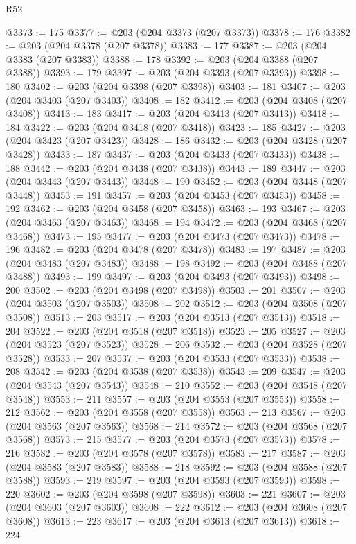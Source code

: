 \begin{lexlean}{R52}
\begin{coremodule}
@3373 := 175
@3377 := @203 (@204 @3373 (@207 @3373))
@3378 := 176
@3382 := @203 (@204 @3378 (@207 @3378))
@3383 := 177
@3387 := @203 (@204 @3383 (@207 @3383))
@3388 := 178
@3392 := @203 (@204 @3388 (@207 @3388))
@3393 := 179
@3397 := @203 (@204 @3393 (@207 @3393))
@3398 := 180
@3402 := @203 (@204 @3398 (@207 @3398))
@3403 := 181
@3407 := @203 (@204 @3403 (@207 @3403))
@3408 := 182
@3412 := @203 (@204 @3408 (@207 @3408))
@3413 := 183
@3417 := @203 (@204 @3413 (@207 @3413))
@3418 := 184
@3422 := @203 (@204 @3418 (@207 @3418))
@3423 := 185
@3427 := @203 (@204 @3423 (@207 @3423))
@3428 := 186
@3432 := @203 (@204 @3428 (@207 @3428))
@3433 := 187
@3437 := @203 (@204 @3433 (@207 @3433))
@3438 := 188
@3442 := @203 (@204 @3438 (@207 @3438))
@3443 := 189
@3447 := @203 (@204 @3443 (@207 @3443))
@3448 := 190
@3452 := @203 (@204 @3448 (@207 @3448))
@3453 := 191
@3457 := @203 (@204 @3453 (@207 @3453))
@3458 := 192
@3462 := @203 (@204 @3458 (@207 @3458))
@3463 := 193
@3467 := @203 (@204 @3463 (@207 @3463))
@3468 := 194
@3472 := @203 (@204 @3468 (@207 @3468))
@3473 := 195
@3477 := @203 (@204 @3473 (@207 @3473))
@3478 := 196
@3482 := @203 (@204 @3478 (@207 @3478))
@3483 := 197
@3487 := @203 (@204 @3483 (@207 @3483))
@3488 := 198
@3492 := @203 (@204 @3488 (@207 @3488))
@3493 := 199
@3497 := @203 (@204 @3493 (@207 @3493))
@3498 := 200
@3502 := @203 (@204 @3498 (@207 @3498))
@3503 := 201
@3507 := @203 (@204 @3503 (@207 @3503))
@3508 := 202
@3512 := @203 (@204 @3508 (@207 @3508))
@3513 := 203
@3517 := @203 (@204 @3513 (@207 @3513))
@3518 := 204
@3522 := @203 (@204 @3518 (@207 @3518))
@3523 := 205
@3527 := @203 (@204 @3523 (@207 @3523))
@3528 := 206
@3532 := @203 (@204 @3528 (@207 @3528))
@3533 := 207
@3537 := @203 (@204 @3533 (@207 @3533))
@3538 := 208
@3542 := @203 (@204 @3538 (@207 @3538))
@3543 := 209
@3547 := @203 (@204 @3543 (@207 @3543))
@3548 := 210
@3552 := @203 (@204 @3548 (@207 @3548))
@3553 := 211
@3557 := @203 (@204 @3553 (@207 @3553))
@3558 := 212
@3562 := @203 (@204 @3558 (@207 @3558))
@3563 := 213
@3567 := @203 (@204 @3563 (@207 @3563))
@3568 := 214
@3572 := @203 (@204 @3568 (@207 @3568))
@3573 := 215
@3577 := @203 (@204 @3573 (@207 @3573))
@3578 := 216
@3582 := @203 (@204 @3578 (@207 @3578))
@3583 := 217
@3587 := @203 (@204 @3583 (@207 @3583))
@3588 := 218
@3592 := @203 (@204 @3588 (@207 @3588))
@3593 := 219
@3597 := @203 (@204 @3593 (@207 @3593))
@3598 := 220
@3602 := @203 (@204 @3598 (@207 @3598))
@3603 := 221
@3607 := @203 (@204 @3603 (@207 @3603))
@3608 := 222
@3612 := @203 (@204 @3608 (@207 @3608))
@3613 := 223
@3617 := @203 (@204 @3613 (@207 @3613))
@3618 := 224

\end{coremodule}
\end{lexlean}
